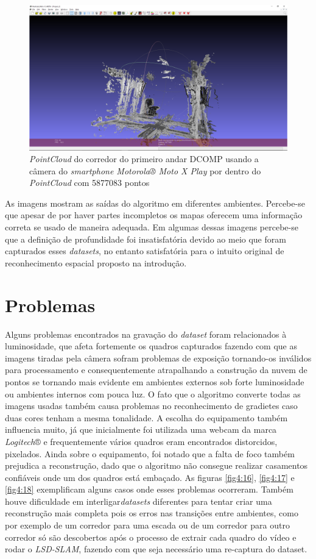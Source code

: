 \begin{figure}[H]
	\centering
		\includegraphics[width= \textwidth]{Imagens/corredorMotoxdentro.PNG}
	\caption{\textit{PointCloud} do corredor do primeiro andar DCOMP usando a câmera do \textit{smartphone Motorola® Moto X Play} por dentro do \textit{PointCloud} com 5877083 pontos}
\end{figure}

As imagens mostram as saídas do algoritmo em diferentes ambientes. Percebe-se que apesar de por haver partes incompletos os mapas oferecem uma informação correta se usado de maneira adequada. Em algumas dessas imagens percebe-se que a definição de profundidade foi insatisfatória devido ao meio que foram capturados esses \textit{datasets}, no entanto satisfatória para o intuito original de reconhecimento espacial proposto na introdução.

\section{Problemas}

Alguns problemas encontrados na gravação do \textit{dataset} foram relacionados à luminosidade, que afeta fortemente os quadros capturados fazendo com que as imagens tiradas pela câmera sofram problemas de exposição tornando-os inválidos para processamento e consequentemente atrapalhando a construção da nuvem de pontos se tornando mais evidente em ambientes externos sob forte luminosidade ou ambientes internos com pouca luz. O fato que o algoritmo converte todas as imagens usadas também causa problemas no reconhecimento de gradietes caso duas cores tenham a mesma tonalidade. A escolha do equipamento também influencia muito, já que inicialmente foi utilizada uma webcam da marca \textit{Logitech}® e frequentemente vários quadros eram encontrados distorcidos, pixelados. Ainda sobre o equipamento, foi notado que a falta de foco também prejudica a reconstrução, dado que o algoritmo não consegue realizar casamentos confiáveis onde um dos quadros está embaçado. As figuras \ref{fig4:16}, \ref{fig4:17} e \ref{fig4:18}  exemplificam alguns casos onde esses problemas ocorreram. Também houve dificuldade em interligar\textit{datasets} diferentes para tentar criar uma reconstrução mais completa pois os erros nas transições entre ambientes, como por exemplo de um corredor para uma escada ou de um corredor para outro corredor só são descobertos após o processo de extrair cada quadro do vídeo e rodar o \textit{LSD-SLAM}, fazendo com que seja necessário uma re-captura do dataset. 

